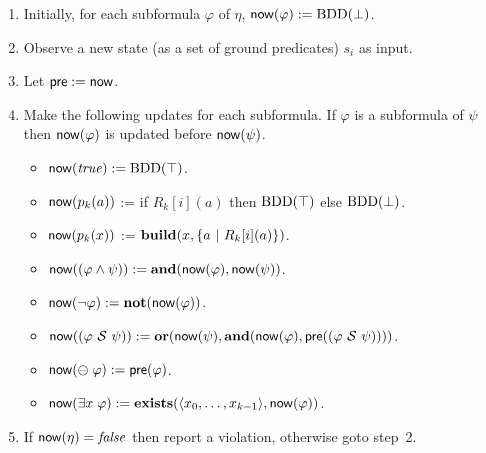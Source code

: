 \begin{enumerate}
\item Initially, for each subformula $\varphi$ of $\eta$,
$\mathsf{now} ( \varphi ) := \mathrm{BDD}(\bot)$.
\item Observe a new state (as a set of ground predicates) $s_i$ as input. 
\item Let $\mathsf{pre} := \mathsf{now}$.
\item Make the following updates for each subformula. If $\varphi$ is
      a subformula of $\psi$ then $\mathsf{now} ( \varphi )$ is updated before 
      $\mathsf{now} ( \psi )$.
\begin{itemize}
  \item $\mathsf{now} ( \mathit{true} ) := \mathrm{BDD}(\top)$.
  \item $\mathsf{now} ( p_k ( a ) )$ := if $R_k [ i ] ( a )$ then
  $\mathrm{BDD}(\top)$ else $\mathrm{BDD}(\bot)$.
  \item $\mathsf{now} ( p_k ( x ) )$ :=
     $\mathbf{build} ( x ,  \{ a \ | \ R_k[i] ( a  ) \} )$.
  \item $\mathsf{now} ( ( \varphi \wedge \psi ) ) := 
  \mathbf{and} ( \mathsf{now} ( \varphi ) , \mathsf{now} ( \psi ))$.
  \item $\mathsf{now} ( \neg \varphi  ) := \mathbf{not} ( \mathsf{now} ( \varphi ))$.
  \item $\mathsf{now} ( ( \varphi\ {\cal S}\ \psi ) ) :=  
  \mathbf{or} ( \mathsf{now} ( \psi  ) , \mathbf{and} ( \mathsf{now} ( \varphi ) ,
      \mathsf{pre} ( ( \varphi \ {\cal S} \ \psi ))))$.
  \item $\mathsf{now} ( \ominus \; \varphi ) := \mathsf{pre} ( \varphi )$.
  \item $\mathsf{now} ( \exists x \; \varphi ) := 
  \mathbf{exists} (\langle x_0,\ldots,x_{k-1} \rangle, \mathsf{now} ( \varphi ))$.
\end{itemize}
\item If $\mathsf{now} (\eta) = \mathit{false}$ then
report a violation, otherwise goto step~2.
\end{enumerate}

